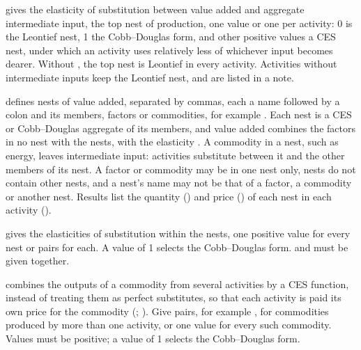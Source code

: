 \begin{optdesc}
\item[\optarg{}{sigmaa}{numlist}] gives the elasticity of substitution between
value added and aggregate intermediate input, the top nest of production, one
value or one per activity: 0 is the Leontief nest, 1 the Cobb--Douglas form,
and other positive values a CES nest, under which an activity uses relatively
less of whichever input becomes dearer. Without , the top nest is
Leontief in every activity. Activities without intermediate inputs keep the
Leontief nest, and are listed in a note.

\item[\optarg{nest}{s}{spec}] defines nests of value added, separated by
commas, each a name followed by a colon and its members, factors or
commodities, for example .
Each nest is a CES or Cobb--Douglas aggregate of its members, and value added
combines the factors in no nest with the nests, with the elasticity
. A commodity in a nest, such as energy, leaves intermediate
input: activities substitute between it and the other members of its nest. A
factor or commodity may be in one nest only, nests do not contain other nests,
and a nest's name may not be that of a factor, a commodity or another nest.
Results list the quantity () and price () of each nest in
each activity ().

\item[\optarg{sigman}{est}{spec}] gives the elasticities of substitution within
the nests, one positive value for every nest or
\cmd{:} pairs for each. A value of 1 selects the
Cobb--Douglas form.  and  must be given together.

\item[\optarg{}{sigmaac}{spec}] combines the outputs of a commodity from
several activities by a CES function, instead of treating them as perfect
substitutes, so that each activity is paid its own price for the commodity
(; ). Give \cmd{:}
pairs, for example , for commodities produced by more
than one activity, or one value for every such commodity. Values must be
positive; a value of 1 selects the Cobb--Douglas form.
\end{optdesc}


